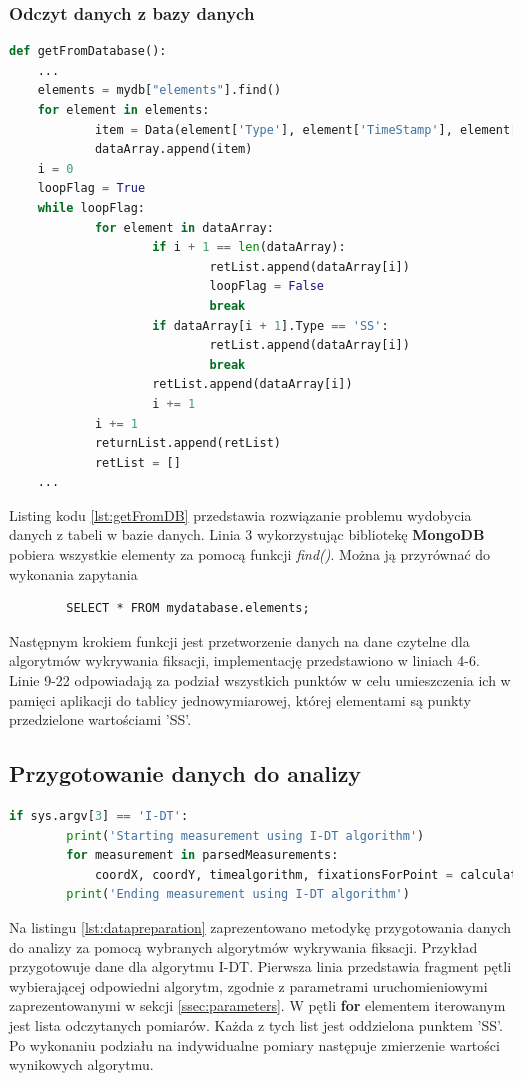 \subsubsection{Odczyt danych z bazy danych}
\label{ssec:getDB}
\begin{lstlisting}[language=Python, caption=Odczyt danych z bazy danych, label={lst:getFromDB}]
def getFromDatabase():
    ...
    elements = mydb["elements"].find()
    for element in elements:
            item = Data(element['Type'], element['TimeStamp'], element['CoordX'], element['CoordY'])
            dataArray.append(item)
    i = 0
    loopFlag = True
    while loopFlag:
            for element in dataArray:
                    if i + 1 == len(dataArray):
                            retList.append(dataArray[i])
                            loopFlag = False
                            break
                    if dataArray[i + 1].Type == 'SS':
                            retList.append(dataArray[i])
                            break
                    retList.append(dataArray[i])
                    i += 1
            i += 1
            returnList.append(retList)
            retList = []
    ...
    \end{lstlisting}
Listing kodu \ref{lst:getFromDB} przedstawia rozwiązanie problemu wydobycia danych z tabeli w bazie danych. Linia 3 wykorzystując bibliotekę \textbf{MongoDB} pobiera wszystkie elementy za pomocą funkcji \emph{find()}. Można ją przyrównać do wykonania zapytania 
\begin{verbatim}
        SELECT * FROM mydatabase.elements;
\end{verbatim}
Następnym krokiem funkcji jest przetworzenie danych na dane czytelne dla algorytmów wykrywania fiksacji, implementację przedstawiono w liniach 4-6. Linie 9-22 odpowiadają za podział wszystkich punktów w celu umieszczenia ich w pamięci aplikacji do tablicy jednowymiarowej, której elementami są punkty przedzielone wartościami 'SS'.
\subsection{Przygotowanie danych do analizy}
\label{ssec:Dataanalysis}
\begin{lstlisting}[language=Python, caption=Przygotowanie danych do dalszej analizy, label={lst:datapreparation}]
        if sys.argv[3] == 'I-DT':
        print('Starting measurement using I-DT algorithm')
        for measurement in parsedMeasurements:
            coordX, coordY, timealgorithm, fixationsForPoint = calculateIdtAlgorithm(m1)
        print('Ending measurement using I-DT algorithm')
\end{lstlisting}
Na listingu \ref{lst:datapreparation} zaprezentowano metodykę przygotowania danych do analizy za pomocą wybranych algorytmów wykrywania fiksacji. Przykład przygotowuje dane dla algorytmu I-DT. Pierwsza linia przedstawia fragment pętli wybierającej odpowiedni algorytm, zgodnie z parametrami uruchomieniowymi zaprezentowanymi w sekcji \ref{ssec:parameters}. W pętli \textbf{for} elementem iterowanym jest lista odczytanych pomiarów. Każda z tych list jest oddzielona punktem 'SS'. Po wykonaniu podziału na indywidualne pomiary następuje zmierzenie wartości wynikowych algorytmu.
